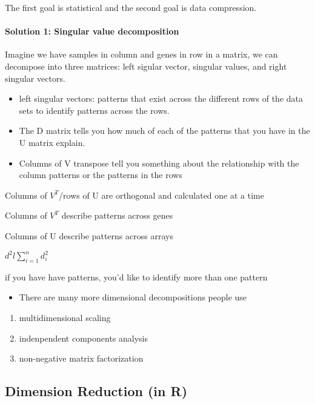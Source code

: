 \documentclass[]{article}
\providecommand{\tightlist}{%
  \setlength{\itemsep}{0pt}\setlength{\parskip}{0pt}}
\let\oldparagraph\paragraph
\renewcommand{\paragraph}[1]{\oldparagraph{#1}\mbox{}}
\begin{document}
The first goal is statistical and the second goal is data compression.

\paragraph{Solution 1: Singular value
decomposition}\label{solution-1-singular-value-decomposition}

Imagine we have samples in column and genes in row in a matrix, we can
decompose into three matrices: left sigular vector, singular values, and
right singular vectors.

\begin{itemize}
\tightlist
\item
  left singular vectors: patterns that exist across the different rows
  of the data sets to identify patterns across the rows.
\item
  The D matrix tells you how much of each of the patterns that you have
  in the U matrix explain.
\item
  Columns of V transpose tell you something about the relationship with
  the column patterns or the patterns in the rows
\end{itemize}

Columns of \(V^T\)/rows of U are orthogonal and calculated one at a time

Columns of \(V^T\) describe patterns across genes

Columns of U describe patterns across arrays

\(d^2l \sum_{i=1}^n d_i^2\)

if you have have patterns, you'd like to identify more than one pattern

\begin{itemize}
\tightlist
\item
  There are many more dimensional decompositions people use
\end{itemize}

\begin{enumerate}
\def\labelenumi{\arabic{enumi})}
\tightlist
\item
  multidimensional scaling
\item
  indenpendent components analysis
\item
  non-negative matrix factorization
\end{enumerate}

\subsection{Dimension Reduction (in R)}\label{dimension-reduction-in-r}
\end{document}
